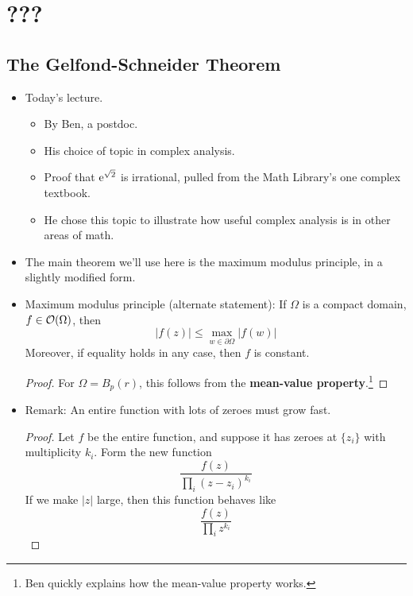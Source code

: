 \documentclass[../notes.tex]{subfiles}
\begin{document}
\chapter{???}
\section{The Gelfond-Schneider Theorem}
\begin{itemize}
    \item {}Today's lecture.
    \begin{itemize}
        \item By Ben, a postdoc.
        \item His choice of topic in complex analysis.
        \item Proof that $\e[\sqrt{2}]$ is irrational, pulled from the Math Library's one complex textbook.
        \item He chose this topic to illustrate how useful complex analysis is in other areas of math.
    \end{itemize}
    \item The main theorem we'll use here is the maximum modulus principle, in a slightly modified form.
    \item Maximum modulus principle (alternate statement): If $\Omega$ is a compact domain, $f\in\mO(\Omega)$, then
    \begin{equation*}
        |f(z)| \leq \max_{w\in\partial\Omega}|f(w)|
    \end{equation*}
    Moreover, if equality holds in any case, then $f$ is constant.
    \begin{proof}
        For $\Omega=B_p(r)$, this follows from the \textbf{mean-value property}.\footnote{Ben quickly explains how the mean-value property works.}
    \end{proof}
    \item Remark: An entire function with lots of zeroes must grow fast.
    \begin{proof}
        Let $f$ be the entire function, and suppose it has zeroes at $\{z_i\}$ with multiplicity $k_i$. Form the new function
        \begin{equation*}
            \frac{f(z)}{\prod_i(z-z_i)^{k_i}}
        \end{equation*}
        If we make $|z|$ large, then this function behaves like
        \begin{equation*}
            \frac{f(z)}{\prod_iz^{k_i}}
        \end{equation*}

\end{proof}
\end{itemize}
\end{document}
